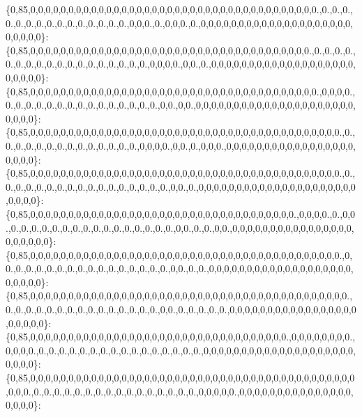 \{0,85,0,0,0,0,0,0,0,0,0,0,0,0,0,0,0,0,0,0,0,0,0,0,0,0,0,0,0,0,0,0,0,0,0,0,0,0,0,0.,0.,0.,0.,0.,0.,0.,0.,0.,0.,0.,0.,0.,0.,0.,0.,0,0,0.,0.,0,0,0.,0.,0,0,0,0,0,0,0,0,0,0,0,0,0,0,0,0,0,0,0,0,0,0,0,0,0\}\+: \{0,85,0,0,0,0,0,0,0,0,0,0,0,0,0,0,0,0,0,0,0,0,0,0,0,0,0,0,0,0,0,0,0,0,0,0,0,0,0.,0.,0.,0.,0.,0.,0.,0.,0.,0.,0.,0.,0.,0.,0.,0.,0.,0.,0.,0,0,0,0.,0,0.,0.,0,0,0,0,0,0,0,0,0,0,0,0,0,0,0,0,0,0,0,0,0,0,0,0\}\+: \{0,85,0,0,0,0,0,0,0,0,0,0,0,0,0,0,0,0,0,0,0,0,0,0,0,0,0,0,0,0,0,0,0,0,0,0,0,0,0,0.,0,0,0,0.,0.,0.,0.,0.,0.,0.,0.,0.,0.,0.,0.,0.,0.,0.,0.,0,0.,0,0.,0,0,0,0,0,0,0,0,0,0,0,0,0,0,0,0,0,0,0,0,0,0,0,0,0\}\+: \{0,85,0,0,0,0,0,0,0,0,0,0,0,0,0,0,0,0,0,0,0,0,0,0,0,0,0,0,0,0,0,0,0,0,0,0,0,0,0,0,0,0,0.,0.,0.,0.,0.,0.,0.,0.,0.,0.,0.,0.,0.,0.,0.,0,0,0,0.,0,0.,0.,0,0,0.,0,0,0,0,0,0,0,0,0,0,0,0,0,0,0,0,0,0,0,0,0\}\+: \{0,85,0,0,0,0,0,0,0,0,0,0,0,0,0,0,0,0,0,0,0,0,0,0,0,0,0,0,0,0,0,0,0,0,0,0,0,0,0,0,0,0,0.,0.,0.,0.,0.,0.,0.,0.,0.,0.,0.,0.,0.,0.,0.,0.,0.,0.,0,0.,0.,0,0,0,0,0,0,0,0,0,0,0,0,0,0,0,0,0,0,0,0,0,0,0,0,0\}\+: \{0,85,0,0,0,0,0,0,0,0,0,0,0,0,0,0,0,0,0,0,0,0,0,0,0,0,0,0,0,0,0,0,0,0,0,0,0.,0,0,0,0.,0.,0,0.,0.,0.,0.,0.,0.,0.,0.,0.,0.,0.,0.,0.,0.,0.,0.,0.,0,0.,0.,0.,0,0.,0,0,0,0,0,0,0,0,0,0,0,0,0,0,0,0,0,0,0,0,0,0\}\+: \{0,85,0,0,0,0,0,0,0,0,0,0,0,0,0,0,0,0,0,0,0,0,0,0,0,0,0,0,0,0,0,0,0,0,0,0,0,0,0,0,0,0,0.,0,0.,0.,0.,0.,0.,0.,0.,0.,0.,0.,0.,0.,0.,0.,0.,0.,0,0.,0.,0.,0,0,0,0,0,0,0,0,0,0,0,0,0,0,0,0,0,0,0,0,0,0,0,0\}\+: \{0,85,0,0,0,0,0,0,0,0,0,0,0,0,0,0,0,0,0,0,0,0,0,0,0,0,0,0,0,0,0,0,0,0,0,0,0,0,0,0,0,0,0,0.,0.,0.,0.,0.,0.,0.,0.,0.,0.,0.,0.,0.,0.,0.,0.,0,0.,0.,0.,0.,0.,0.,0,0,0,0,0,0,0,0,0,0,0,0,0,0,0,0,0,0,0,0,0,0\}\+: \{0,85,0,0,0,0,0,0,0,0,0,0,0,0,0,0,0,0,0,0,0,0,0,0,0,0,0,0,0,0,0,0,0,0,0,0.,0,0,0,0,0,0,0,0.,0,0,0,0.,0.,0.,0.,0.,0.,0.,0.,0.,0.,0.,0.,0.,0.,0.,0.,0.,0,0,0,0,0,0,0,0,0,0,0,0,0,0,0,0,0,0,0,0,0,0,0,0\}\+: \{0,85,0,0,0,0,0,0,0,0,0,0,0,0,0,0,0,0,0,0,0,0,0,0,0,0,0,0,0,0,0,0,0,0,0,0,0,0,0,0,0,0,0,0,0,0,0,0.,0.,0.,0.,0.,0.,0.,0.,0.,0.,0.,0.,0.,0.,0.,0.,0.,0,0,0,0,0.,0,0,0,0,0,0,0,0,0,0,0,0,0,0,0,0,0,0,0\}\+: 